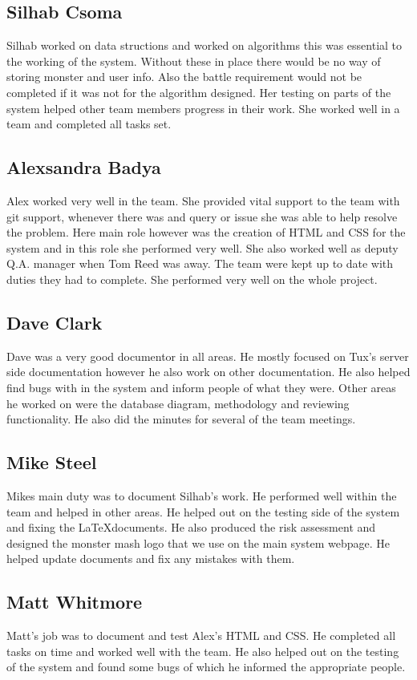 \documentclass{project}
\begin{document}
\subsection{Silhab Csoma}
Silhab worked on data structions and worked on algorithms this was essential to the working of the system. Without these in place there would be no way of storing monster and user info. Also the battle requirement would not be completed if it was not for the algorithm designed. Her testing on parts of the system helped other team members progress in their work. She worked well in a team and completed all tasks set. 

\subsection{Alexsandra Badya}
Alex worked very well in the team. She provided vital support to the team with git support, whenever there was and query or issue she was able to help resolve the problem. Here main role however was the creation of HTML and CSS for the system and in this role she performed very well. She also worked well as deputy Q.A. manager when Tom Reed was away. The team were kept up to date with duties they had to complete. She performed very well on the whole project.

\subsection{Dave Clark}
Dave was a very good documentor in all areas. He mostly focused on Tux's server side documentation however he also work on other documentation. He also helped find bugs with in the system and inform people of what they were. Other areas he worked on were the database diagram, methodology and reviewing functionality. He also did the minutes for several of the team meetings.

\subsection{Mike Steel}
Mikes main duty was to document Silhab's work. He performed well within the team and helped in other areas. He helped out on the testing side of the system and fixing the \LaTeX  documents. He also produced the risk assessment and designed the monster mash logo that we use on the main system webpage. He helped update documents and fix any mistakes with them.

\subsection{Matt Whitmore}
Matt's job was to document and test Alex's HTML and CSS. He completed all tasks on time and worked well with the team. He also helped out on the testing of the system and found some bugs of which he informed the appropriate people. 
\end{document}
